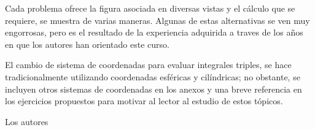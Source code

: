 Cada problema ofrece la figura asociada en diversas vistas y el cálculo que se requiere, se muestra de varias maneras.
Algunas de estas alternativas se ven muy engorrosas, pero es el resultado de la experiencia adquirida a traves de los años
en que los autores han orientado este curso.

El cambio de sistema de coordenadas para evaluar integrales triples, se hace tradicionalmente utilizando coordenadas esféricas y cilíndricas; no obstante, se incluyen otros sistemas de coordenadas en los anexos y una breve referencia en los ejercicios propuestos para motivar al lector al estudio de estos tópicos.


\begin{flushright}
  Los autores
\end{flushright}

\newpage